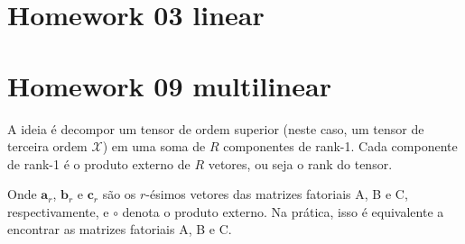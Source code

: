 \section{Homework 03 linear}

\section{Homework 09 multilinear}

A ideia é decompor um tensor de ordem superior (neste caso, um tensor de terceira ordem $\mathcal{X}$) em uma soma de $R$ componentes de rank-1. Cada componente de rank-1 é o produto externo de $R$ vetores, ou seja o rank do tensor.

Onde $\mathbf{a}_r$, $\mathbf{b}_r$ e $\mathbf{c}_r$ são os $r$-ésimos vetores das matrizes fatoriais A, B e C, respectivamente, e $\circ$ denota o produto externo. Na prática, isso é equivalente a encontrar as matrizes fatoriais A, B e C.


